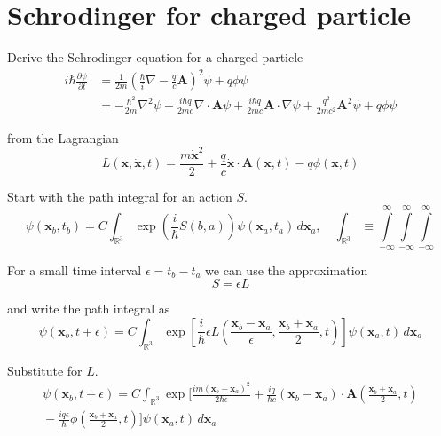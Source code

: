 

\section*{Schrodinger for charged particle}

Derive the Schrodinger equation for a charged particle
\begin{align*}
i\hbar\frac{\partial\psi}{\partial t}
&=\frac{1}{2m}\left(\frac{\hbar}{i}\nabla-\frac{q}{c}\mathbf A\right)^2\psi+q\phi\psi
\\
&=-\frac{\hbar^2}{2m}\nabla^2\psi
+\frac{i\hbar q}{2mc}\nabla\cdot\mathbf A\psi
+\frac{i\hbar q}{2mc}\mathbf A\cdot\nabla\psi
+\frac{q^2}{2mc^2}\mathbf A^2\psi
+q\phi\psi
\end{align*}

from the Lagrangian
\begin{equation*}
L(\mathbf x,\dot{\mathbf x},t)=\frac{m\dot{\mathbf x}^2}{2}
+\frac{q}{c}\dot{\mathbf x}\cdot\mathbf A(\mathbf x,t)-q\phi(\mathbf x,t)
\end{equation*}

Start with the path integral for an action $S$.
\begin{equation*}
\psi(\mathbf x_b,t_b)
=C\int_{\mathbb R^3}\exp\left(\frac{i}{\hbar}S(b,a)\right)
\psi(\mathbf x_a,t_a)\,d\mathbf x_a,\quad
\int_{\mathbb R^3}\equiv\int\limits_{-\infty}^\infty\int\limits_{-\infty}^\infty\int\limits_{-\infty}^\infty
\end{equation*}

For a small time interval $\epsilon=t_b-t_a$ we can use the approximation
\begin{equation*}
S=\epsilon L
\end{equation*}

and write the path integral as
\begin{equation*}
\psi(\mathbf x_b,t+\epsilon)=C\int_{\mathbb R^3}
\exp\left[\frac{i}{\hbar}
\epsilon L\left(\frac{\mathbf x_b-\mathbf x_a}{\epsilon},\frac{\mathbf x_b+\mathbf x_a}{2},t\right)
\right]
\psi(\mathbf x_a,t)\,d\mathbf x_a
\end{equation*}

Substitute for $L$.
\begin{multline*}
\psi(\mathbf x_b,t+\epsilon)=C\int_{\mathbb R^3}
\exp\biggl[\frac{im(\mathbf x_b-\mathbf x_a)^2}{2\hbar\epsilon}
+\frac{iq}{\hbar c}(\mathbf x_b-\mathbf x_a)
\cdot\mathbf A\left(\frac{\mathbf x_b+\mathbf x_a}{2},t\right)
\\
{}-\frac{iq\epsilon}{\hbar}\phi\left(\frac{\mathbf x_b+\mathbf x_a}{2},t\right)
\biggr]
\psi(\mathbf x_a,t)
\,d\mathbf x_a
\end{multline*}

